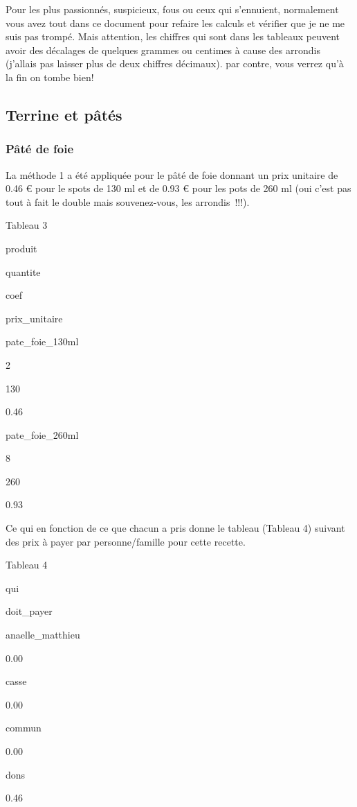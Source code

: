 \documentclass[]{article}
\begin{document}
Pour les plus passionnés, suspicieux, fous ou ceux qui s'ennuient,
normalement vous avez tout dans ce document pour refaire les calculs et
vérifier que je ne me suis pas trompé. Mais attention, les chiffres qui
sont dans les tableaux peuvent avoir des décalages de quelques grammes
ou centimes à cause des arrondis (j'allais pas laisser plus de deux
chiffres décimaux). par contre, vous verrez qu'à la fin on tombe bien!

\hypertarget{terrine-et-pates}{%
\subsection{Terrine et pâtés}\label{terrine-et-pates}}

\hypertarget{pate-de-foie}{%
\subsubsection{Pâté de foie}\label{pate-de-foie}}

La méthode 1 a été appliquée pour le pâté de foie donnant un prix
unitaire de 0.46 € pour le spots de 130 ml et de 0.93 € pour les pots de
260 ml (oui c'est pas tout à fait le double mais souvenez-vous, les
arrondis~!!!).

Tableau 3

produit

quantite

coef

prix\_unitaire

pate\_foie\_130ml

2

130

0.46

pate\_foie\_260ml

8

260

0.93

Ce qui en fonction de ce que chacun a pris donne le tableau (Tableau 4)
suivant des prix à payer par personne/famille pour cette recette.

Tableau 4

qui

doit\_payer

anaelle\_matthieu

0.00

casse

0.00

commun

0.00

dons

0.46
\end{document}
